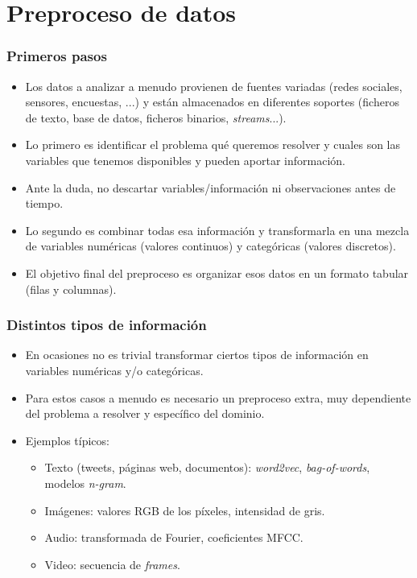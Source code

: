 \documentclass{beamer}
\begin{document}
\section{Preproceso de datos}

\begin{frame}
\frametitle{Primeros pasos}

\begin{itemize}
\item Los datos a analizar a menudo provienen de fuentes variadas (redes sociales, sensores, encuestas, ...) y están almacenados en diferentes soportes (ficheros de texto, base de datos, ficheros binarios, \textit{streams}...).
\item Lo primero es identificar el problema qué queremos resolver y cuales son las variables que tenemos disponibles y pueden aportar información.
\item Ante la duda, no descartar variables/información ni observaciones antes de tiempo.
\item Lo segundo es combinar todas esa información y transformarla en una mezcla de variables numéricas (valores continuos) y categóricas (valores discretos).
\item El objetivo final del preproceso es organizar esos datos en un formato tabular (filas y columnas).
\end{itemize}

\end{frame}

\begin{frame}
\frametitle{Distintos tipos de información}

\begin{itemize}\addtolength{\itemsep}{\fill}
\item En ocasiones no es trivial transformar ciertos tipos de información en variables numéricas y/o categóricas.
\item Para estos casos a menudo es necesario un preproceso extra, muy dependiente del problema a resolver y específico del dominio.
\item Ejemplos típicos:
\begin{itemize}
\item Texto (tweets, páginas web, documentos): \textit{word2vec}, \textit{bag-of-words}, modelos \textit{n-gram}.
\item Imágenes: valores RGB de los píxeles, intensidad de gris.
\item Audio: transformada de Fourier, coeficientes MFCC.
\item Video: secuencia de \textit{frames}.
\end{itemize}
\end{itemize}
\end{frame}
\end{document}
